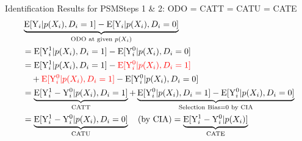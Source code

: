 \documentclass[dvipsnames,hyperref={pdfpagelabels=false}]{beamer}
\begin{document}
\begin{frame}{Identification Results for PSM}{Steps 1 \& 2: ODO = CATT = CATU = CATE}
{\small
\begin{equation*}
\begin{aligned}
&
\underbrace{\mathrm{E}[\mathrm{Y}_{i}|p(X_{i}),D_{i}=1] - \mathrm{E}[\mathrm{Y}_{i}|p(X_{i}),D_{i}=0]}_{\text{ODO at given } p(X_{i})}  \\
&=\mathrm{E}[\mathrm{Y}^{1}_{i}|p(X_{i}),D_{i}=1] - \mathrm{E}[\mathrm{Y}^{0}_{i}|p(X_{i}),D_{i}=0] \\
&= \mathrm{E}[\mathrm{Y}^{1}_{i}|p(X_{i}),D_i=1]-{\color{red} \mathrm{E}[\mathrm{Y}^{0}_{i}|p(X_{i}),D_i=1]} \\
&\quad + {\color{red} \mathrm{E}[\mathrm{Y}^{0}_{i}|p(X_{i}),D_i=1]}-\mathrm{E}[\mathrm{Y}^{0}_{i}|p(X_{i}),D_i=0] \\
&= \underbrace{\mathrm{E}[\mathrm{Y}^{1}_{i}-\mathrm{Y}^{0}_{i}|p(X_{i}),D_i=1]}_{\text{CATT}}
+ \underbrace{\mathrm{E}[\mathrm{Y}^{0}_{i}|p(X_{i}),D_i=1]-\mathrm{E}[\mathrm{Y}^{0}_{i}|p(X_{i}),D_i=0]}_{\scriptstyle\text{Selection Bias} = 0 \text{ by CIA}}  \\
&= \underbrace{\mathrm{E}[\mathrm{Y}^{1}_{i}-\mathrm{Y}^{0}_{i}|p(X_{i}),D_i=0]}_{\text{CATU}} \quad \text{(by CIA)}
= \underbrace{\mathrm{E}[\mathrm{Y}^{1}_{i}-\mathrm{Y}^{0}_{i}|p(X_{i})]}_{\text{CATE}}
\end{aligned}
\end{equation*}
}
\end{frame}


\end{document}
